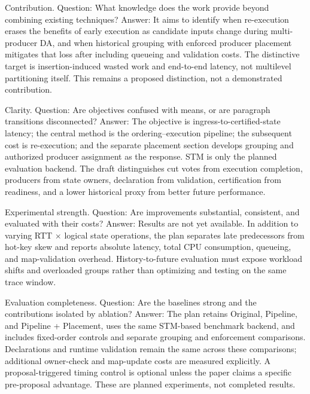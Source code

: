 \documentclass[11pt]{article}
\begin{document}
Contribution. Question: What knowledge does the work provide beyond combining existing techniques? Answer: It aims to identify when re-execution erases the benefits of early execution as candidate inputs change during multi-producer DA, and when historical grouping with enforced producer placement mitigates that loss after including queueing and validation costs. The distinctive target is insertion-induced wasted work and end-to-end latency, not multilevel partitioning itself. This remains a proposed distinction, not a demonstrated contribution.


Clarity. Question: Are objectives confused with means, or are paragraph transitions disconnected? Answer: The objective is ingress-to-certified-state latency; the central method is the ordering--execution pipeline; the subsequent cost is re-execution; and the separate placement section develops grouping and authorized producer assignment as the response. STM is only the planned evaluation backend. The draft distinguishes cut votes from execution completion, producers from state owners, declaration from validation, certification from readiness, and a lower historical proxy from better future performance.


Experimental strength. Question: Are improvements substantial, consistent, and evaluated with their costs? Answer: Results are not yet available. In addition to varying RTT \(\times\) logical state operations, the plan separates late predecessors from hot-key skew and reports absolute latency, total CPU consumption, queueing, and map-validation overhead. History-to-future evaluation must expose workload shifts and overloaded groups rather than optimizing and testing on the same trace window.


Evaluation completeness. Question: Are the baselines strong and the contributions isolated by ablation? Answer: The plan retains Original, Pipeline, and Pipeline + Placement, uses the same STM-based benchmark backend, and includes fixed-order controls and separate grouping and enforcement comparisons. Declarations and runtime validation remain the same across these comparisons; additional owner-check and map-update costs are measured explicitly. A proposal-triggered timing control is optional unless the paper claims a specific pre-proposal advantage. These are planned experiments, not completed results.
\end{document}
